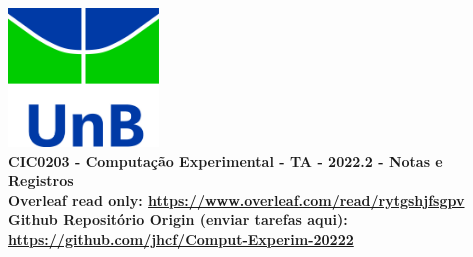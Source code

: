 \documentclass[12pt]{book}
\begin{document}
\clearpage
\thispagestyle{empty}

\begin{titlepage}
\begin{center}
 {\huge\bfseries \includegraphics[width=4cm]{unb-logo.jpg}\\
	CIC0203 - Computação Experimental - TA - 2022.2 - Notas e Registros
	\\Overleaf read only: \url{https://www.overleaf.com/read/rytgshjfsgpv}\\ 
	Github Repositório Origin (enviar tarefas aqui): \url{https://github.com/jhcf/Comput-Experim-20222}\\
	}


\end{center}
\end{titlepage}
\end{document}
